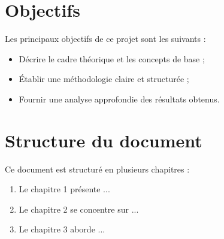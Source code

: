 \section*{Objectifs}
Les principaux objectifs de ce projet sont les suivants :
\begin{itemize}
    \item Décrire le cadre théorique et les concepts de base ;
    \item Établir une méthodologie claire et structurée ;
    \item Fournir une analyse approfondie des résultats obtenus.
\end{itemize}

\section*{Structure du document}
Ce document est structuré en plusieurs chapitres :
\begin{enumerate}
    \item Le chapitre 1 présente ...
    \item Le chapitre 2 se concentre sur ...
    \item Le chapitre 3 aborde ...
\end{enumerate}

\vfill


